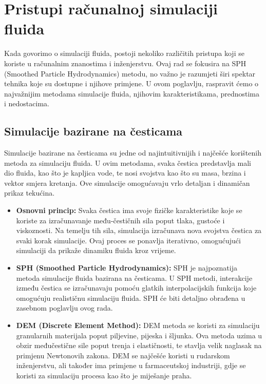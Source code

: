 \documentclass[diplomskirad]{fer}
\begin{document}
    \section{Pristupi računalnoj simulaciji fluida}\label{sec:pristupi-racunalnoj-simulaciji-fluida}

    Kada govorimo o simulaciji fluida, postoji nekoliko različitih pristupa koji se koriste u računalnim znanostima i inženjerstvu.
    Ovaj rad se fokusira na SPH (Smoothed Particle Hydrodynamics) metodu, no važno je razumjeti širi spektar tehnika koje su dostupne i njihove primjene.
    U ovom poglavlju, raspravit ćemo o najvažnijim metodama simulacije fluida, njihovim karakteristikama, prednostima i nedostacima.

    \subsection{Simulacije bazirane na česticama}\label{subsec:simulacije-bazirane-na-cesticama}

    Simulacije bazirane na česticama su jedne od najintuitivnijih i najčešće korištenih metoda za simulaciju fluida.
    U ovim metodama, svaka čestica predstavlja mali dio fluida, kao što je kapljica vode, te nosi svojstva kao što su masa, brzina i vektor smjera kretanja.
    Ove simulacije omogućavaju vrlo detaljan i dinamičan prikaz tekućina.

    \begin{itemize}
        \item \textbf{Osnovni princip:} Svaka čestica ima svoje fizičke karakteristike koje se koriste za izračunavanje među-čestičnih sila poput tlaka, gustoće i viskoznosti. Na temelju tih sila, simulacija izračunava nova svojstva čestica za svaki korak simulacije. Ovaj proces se ponavlja iterativno, omogućujući simulaciji da prikaže dinamiku fluida kroz vrijeme.
        \item \textbf{SPH (Smoothed Particle Hydrodynamics):} SPH je najpoznatija metoda simulacije fluida bazirana na česticama. U SPH metodi, interakcije između čestica se izračunavaju pomoću glatkih interpolacijskih funkcija koje omogućuju realističnu simulaciju fluida. SPH će biti detaljno obrađena u zasebnom poglavlju ovog rada.
        \item \textbf{DEM\cite{DEMmethod} (Discrete Element Method):} DEM metoda se koristi za simulaciju granularnih materijala poput piljevine, pijeska i šljunka. Ova metoda uzima u obzir međučestične sile poput trenja i elastičnosti, te stavlja velik naglasak na primjenu Newtonovih zakona. DEM se najčešće koristi u rudarskom inženjerstvu, ali također ima primjene u farmaceutskoj industriji, gdje se koristi za simulaciju procesa kao što je miješanje praha.
    \end{itemize}
\end{document}
